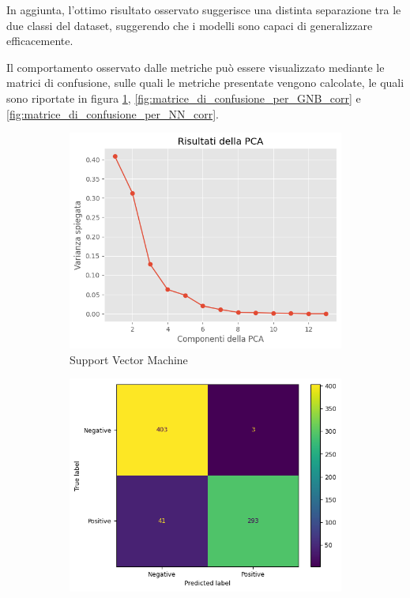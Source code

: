 In aggiunta, l'ottimo risultato osservato suggerisce una distinta separazione tra le
due classi del dataset, suggerendo che i modelli sono capaci di generalizzare
efficacemente.

Il comportamento osservato dalle metriche può essere visualizzato mediante le
matrici di confusione, sulle quali le metriche presentate vengono calcolate, le
quali sono riportate in figura \ref{fig:matrice_di_confusione_per_SVM_corr},
\ref{fig:matrice_di_confusione_per_GNB_corr} e \ref{fig:matrice_di_confusione_per_NN_corr}.
\begin{figure}[!ht]
    \centering
    \begin{subfigure}{0.45\textwidth}
        \centering
        \includegraphics[width=\textwidth]{img/analisi/pcaVarianza.png}
        \caption{Support Vector Machine}
        \label{fig:matrice_di_confusione_per_SVM_corr}
    \end{subfigure}
    \hfill
    \begin{subfigure}{.45\textwidth}
        \centering
        \includegraphics[width=\textwidth]{img/gnb/confusion_matrix_corr.png}

\end{subfigure}
\end{figure}
